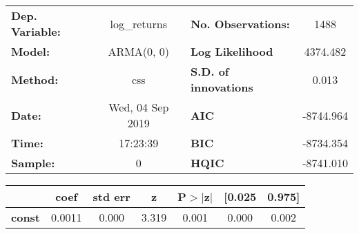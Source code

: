 \begin{center}
\begin{tabular}{lclc}
\toprule
\textbf{Dep. Variable:} &   log\_returns   & \textbf{  No. Observations:  } &    1488     \\
\textbf{Model:}         &    ARMA(0, 0)    & \textbf{  Log Likelihood     } &  4374.482   \\
\textbf{Method:}        &       css        & \textbf{  S.D. of innovations} &   0.013     \\
\textbf{Date:}          & Wed, 04 Sep 2019 & \textbf{  AIC                } & -8744.964   \\
\textbf{Time:}          &     17:23:39     & \textbf{  BIC                } & -8734.354   \\
\textbf{Sample:}        &        0         & \textbf{  HQIC               } & -8741.010   \\
\bottomrule
\end{tabular}
\begin{tabular}{lcccccc}
               & \textbf{coef} & \textbf{std err} & \textbf{z} & \textbf{P$> |$z$|$} & \textbf{[0.025} & \textbf{0.975]}  \\
\midrule
\textbf{const} &       0.0011  &        0.000     &     3.319  &         0.001        &        0.000    &        0.002     \\
\bottomrule
\end{tabular}
\end{center}
